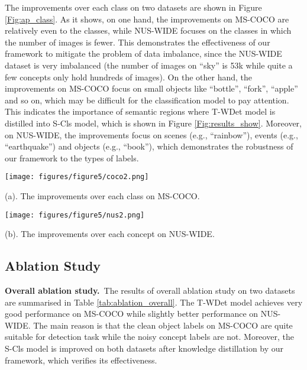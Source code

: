 \documentclass[sigconf,natbib=false]{acmart}
\begin{document}
The improvements over each class on two datasets are shown in Figure \ref{Fig:ap_class}. As it shows, on one hand, the improvements on MS-COCO are relatively even to the classes, while NUS-WIDE focuses on the classes in which the number of images is fewer. This demonstrates the effectiveness of our framework to mitigate the problem of data imbalance, since the NUS-WIDE dataset is very imbalanced (the number of images on ``sky'' is 53k while quite a few concepts only hold hundreds of images). On the other hand, the improvements on MS-COCO focus on small objects like ``bottle'', ``fork'', ``apple'' and so on, which may be difficult for the classification model to pay attention. This indicates the importance of semantic regions where T-WDet model is distilled into S-Cls model, which is shown in Figure \ref{Fig:results_show}. Moreover, on NUS-WIDE, the improvements focus on scenes (e.g., ``rainbow''), events (e.g., ``earthquake'') and objects (e.g., ``book''), which demonstrates the robustness of our framework to the types of labels.
\begin{figure*}[t]
\begin{minipage}[b]{1\linewidth}
  \centering
  \centerline{\texttt{[image: figures/figure5/coco2.png]}}
\centerline{\small (a). The improvements over each class on MS-COCO.}
\end{minipage}
\begin{minipage}[b]{1\linewidth}
  \centering
  \centerline{\texttt{[image: figures/figure5/nus2.png]}}
\centerline{\small (b). The improvements over each concept on NUS-WIDE.}
\end{minipage}
\vspace{-15pt}
\caption{\small The improvements of S-Cls model over each class/concept on two datasets after knowledge distillation with our framework. ``\textcolor[rgb]{1.00,0.00,1.00}{*k}'' indicates the number (divided by 1000) of images including this class/concept. The classes/concepts in horizontal axis are sorted by the number ``\textcolor[rgb]{1.00,0.00,1.00}{*k}'' from large to small.}
\label{Fig:ap_class}
\vspace{-6pt}
\end{figure*}

\vspace{3pt}
\subsection{Ablation Study}
\noindent \textbf{Overall ablation study.}\ The results of overall ablation study on two datasets are summarised in Table \ref{tab:ablation_overall}. The T-WDet model achieves very good performance on MS-COCO while slightly better performance on NUS-WIDE. The main reason is that the clean object labels on MS-COCO are quite suitable for detection task while the noisy concept labels are not. Moreover, the S-Cls model is improved on both datasets after knowledge distillation by our framework, which verifies its effectiveness.
\end{document}
